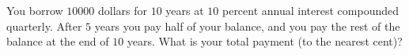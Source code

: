 You borrow $10000$ dollars for $10$ years at $10$ percent annual interest compounded quarterly. After $5$ years you pay half of your balance, and you pay the rest of the balance at the end of $10$ years. What is your total payment (to the nearest cent)?
